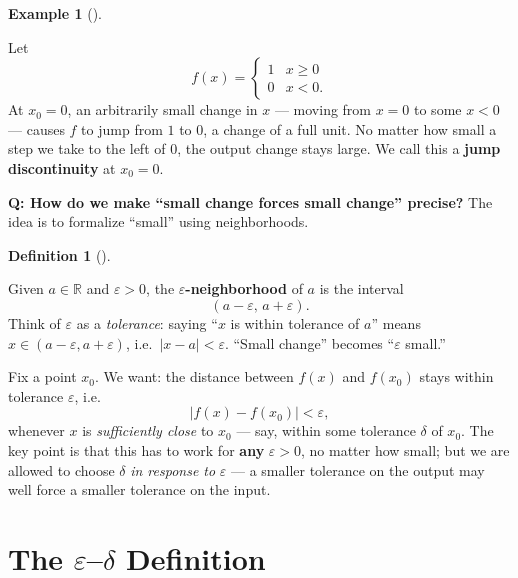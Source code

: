 \documentclass[
  letterpaper,
  DIV=11,
  numbers=noendperiod]{scrreprt}
\theoremstyle{plain}
\theoremstyle{plain}
\theoremstyle{definition}
\newtheorem{definition}{Definition}[chapter]
\theoremstyle{definition}
\theoremstyle{definition}
\newtheorem{example}{Example}[chapter]
\theoremstyle{plain}
\theoremstyle{plain}
\theoremstyle{remark}
\begin{document}
\begin{example}[]\protect\hypertarget{exm-jump-motivation}{}\label{exm-jump-motivation}

\hfill\break
Let \[
f(x) = \begin{cases} 1 & x \ge 0 \\ 0 & x < 0. \end{cases}
\] At \(x_0 = 0\), an arbitrarily small change in \(x\) --- moving from
\(x=0\) to some \(x<0\) --- causes \(f\) to jump from \(1\) to \(0\), a
change of a full unit. No matter how small a step we take to the left of
\(0\), the output change stays large. We call this a \textbf{jump
discontinuity} at \(x_0=0\).

\end{example}

\textbf{Q: How do we make ``small change forces small change'' precise?}
The idea is to formalize ``small'' using neighborhoods.

\begin{definition}[]\protect\hypertarget{def-epsilon-neighborhood}{}\label{def-epsilon-neighborhood}

\hfill\break
Given \(a\in\mathbb{R}\) and \(\varepsilon>0\), the
\textbf{\(\varepsilon\)-neighborhood} of \(a\) is the interval \[
(a-\varepsilon,\, a+\varepsilon).
\] Think of \(\varepsilon\) as a \emph{tolerance}: saying ``\(x\) is
within tolerance of \(a\)'' means \(x\in(a-\varepsilon,a+\varepsilon)\),
i.e.~\(\lvert x-a \rvert<\varepsilon\). ``Small change'' becomes
``\(\varepsilon\) small.''

\end{definition}

Fix a point \(x_0\). We want: the distance between \(f(x)\) and
\(f(x_0)\) stays within tolerance \(\varepsilon\), i.e. \[
\lvert f(x) - f(x_0) \rvert < \varepsilon,
\] whenever \(x\) is \emph{sufficiently close} to \(x_0\) --- say,
within some tolerance \(\delta\) of \(x_0\). The key point is that this
has to work for \textbf{any} \(\varepsilon>0\), no matter how small; but
we are allowed to choose \(\delta\) \emph{in response to}
\(\varepsilon\) --- a smaller tolerance on the output may well force a
smaller tolerance on the input.

\section{\texorpdfstring{The \(\varepsilon\)--\(\delta\)
Definition}{The \textbackslash varepsilon--\textbackslash delta Definition}}\label{the-varepsilondelta-definition}
\end{document}
